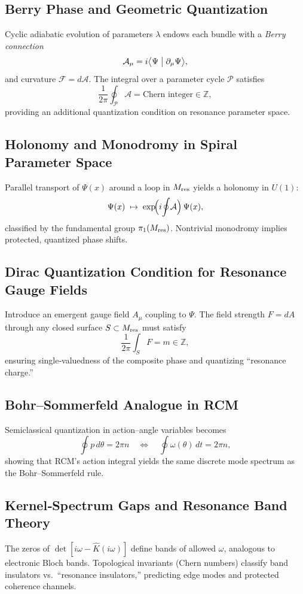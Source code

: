 
\subsection{Berry Phase and Geometric Quantization}
Cyclic adiabatic evolution of parameters \(\lambda\) endows each bundle with a \emph{Berry connection}
\[
\mathcal A_{\mu} = i\bigl\langle \Psi \bigm| \partial_{\mu}\Psi \bigr\rangle,
\]
and curvature
\(\mathcal F = d\mathcal A\).  The integral over a parameter cycle \(\mathcal P\) satisfies
\[
\frac{1}{2\pi}\oint_{\mathcal P}\mathcal A = \text{Chern integer}\in\mathbb Z,
\]
providing an additional quantization condition on resonance parameter space.

\subsection{Holonomy and Monodromy in Spiral Parameter Space}
Parallel transport of \(\Psi(x)\) around a loop in \(M_{\rm res}\) yields a holonomy in \(U(1)\):
\[
\Psi(x)\;\mapsto\;\exp\!\Bigl(i\!\oint\! \mathcal A\Bigr)\,\Psi(x),
\]
classified by the fundamental group \(\pi_{1}(M_{\rm res})\).  Nontrivial monodromy implies protected, quantized phase shifts.

\subsection{Dirac Quantization Condition for Resonance Gauge Fields}
Introduce an emergent gauge field \(A_{\mu}\) coupling to \(\Psi\).  The field strength \(F=dA\) through any closed surface \(S\subset M_{\rm res}\) must satisfy
\[
\frac{1}{2\pi}\int_{S}F = m\in\mathbb Z,
\]
ensuring single‐valuedness of the composite phase and quantizing “resonance charge.”

\subsection{Bohr–Sommerfeld Analogue in RCM}
Semiclassical quantization in action–angle variables becomes
\[
\oint p\,d\theta = 2\pi n
\quad\Longleftrightarrow\quad
\oint \omega(\theta)\,dt = 2\pi n,
\]
showing that RCM’s action integral yields the same discrete mode spectrum as the Bohr–Sommerfeld rule.

\subsection{Kernel‐Spectrum Gaps and Resonance Band Theory}
The zeros of \(\det[i\omega - \widehat K(i\omega)]\) define bands of allowed \(\omega\), analogous to electronic Bloch bands.  Topological invariants (Chern numbers) classify band insulators vs.\ “resonance insulators,” predicting edge modes and protected coherence channels.


